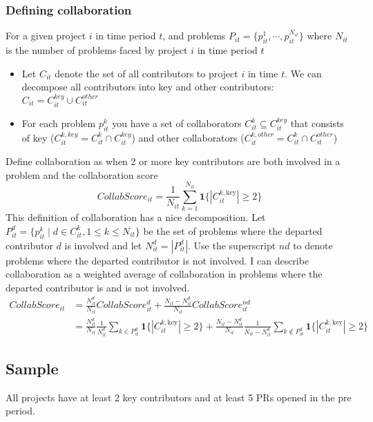 \documentclass[12pt,notitlepage]{article}
\begin{document}
\subsubsection{Defining collaboration}
For a given project $i$ in time period $t$, and problems $P_{it} = \{p_{it}^1, \cdots, p_{it}^{N_{it}} \}$ where $N_{it}$ is the number of problems faced by project $i$ in time period $t$
\begin{itemize}
    \item Let $C_{it}$ denote the set of all contributors to project $i$ in time $t$. We can decompose all contributors into key and other contributors: $C_{it} = C_{it}^{key} \cup C_{it}^{other}$ 
    \item For each problem $p_{it}^k$ you have a set of collaborators $C_{it}^{k} \subseteq C_{it}^{key} $ that consists of key ($C_{it}^{k, key} = C_{it}^{k} \cap C_{it}^{key}$) and other collaborators ($C_{it}^{k, other} = C_{it}^{k} \cap C_{it}^{other}$)
\end{itemize}
Define collaboration as when 2 or more key contributors are both involved in a problem and the collaboration score
\begin{equation}
    CollabScore_{it} = \frac{1}{N_{it}}\sum_{k=1}^{N_{it}}\mathbf{1}\bigl\{|C_{it}^{k,\mathrm{key}}|\ge2\bigr\}
\end{equation}
This definition of collaboration has a nice decomposition. Let $P_{it}^d = \{p_{it}^{k} \mid d \in C_{it}^k, 1 \leq k \leq N_{it} \}$ be the set of problems where the departed contributor $d$ is involved and let $N_{it}^d = |P_{it}^d|$. Use the superscript $nd$ to denote problems where the departed contributor is not involved. I can describe collaboration as a weighted average of collaboration in problems where the departed contributor is and is not involved. 
\begin{align*}
    CollabScore_{it} &= \frac{N_{it}^d}{N_{it}} CollabScore_{it}^d + \frac{N_{it} - N_{it}^d}{N_{it}} CollabScore_{it}^{nd} \\
    &= \frac{N_{it}^d}{N_{it}} \frac{1}{N_{it}^d} \sum_{k \in P_{it}^d} \mathbf{1}\bigl\{|C_{it}^{k,\mathrm{key}}|\ge2\bigr\} + \frac{N_{it} - N_{it}^d}{N_{it}} \frac{1}{N_{it} - N_{it}^d} \sum_{k \notin P_{it}^d} \mathbf{1}\bigl\{|C_{it}^{k,\mathrm{key}}|\ge2\bigr\}
\end{align*}
\subsection{Sample}
All projects have at least 2 key contributors and at least 5 PRs opened in the pre period. 
\end{document}
